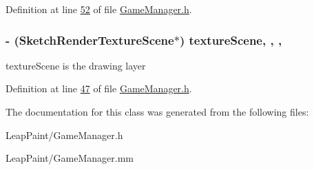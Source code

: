 Definition at line \hyperlink{_game_manager_8h_source_l00052}{52} of file \hyperlink{_game_manager_8h_source}{Game\-Manager.\-h}.

\hypertarget{interface_game_manager_a79a86ff991f39b3007d99ca61af21253}{
\subsubsection[{texture\-Scene}]{\setlength{\rightskip}{0pt plus 5cm}-\/ ({\bf Sketch\-Render\-Texture\-Scene}$\ast$) texture\-Scene\hspace{0.3cm}{\ttfamily [read]}, {\ttfamily [write]}, {\ttfamily [nonatomic]}, {\ttfamily [strong]}}}\label{d4/d94/interface_game_manager_a79a86ff991f39b3007d99ca61af21253}
texture\-Scene is the drawing layer 

Definition at line \hyperlink{_game_manager_8h_source_l00047}{47} of file \hyperlink{_game_manager_8h_source}{Game\-Manager.\-h}.



The documentation for this class was generated from the following files\-:\begin{DoxyCompactItemize}
\item 
Leap\-Paint/Game\-Manager.\-h\item 
Leap\-Paint/Game\-Manager.\-mm\end{DoxyCompactItemize}
